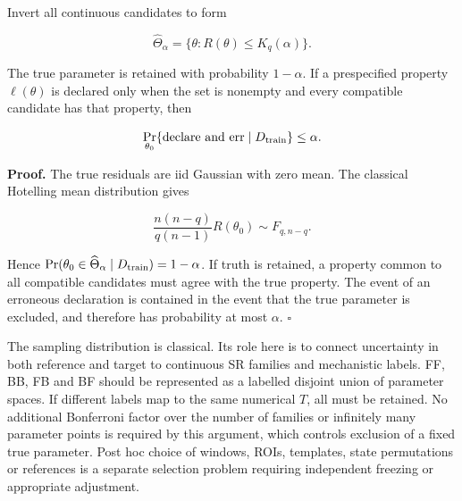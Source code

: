 \documentclass[11pt,a4paper]{article}
\begin{document}
\par
\noindent\begin{minipage}{\linewidth}

Invert all continuous candidates to form

\[
\widehat\Theta_\alpha
=\{\theta:R(\theta)\le K_q(\alpha)\}.
\]

\end{minipage}\par

\par
\noindent\begin{minipage}{\linewidth}

The true parameter is retained with probability \(1-\alpha\). If a
prespecified property \(\ell(\theta)\) is declared only when the set is
nonempty and every compatible candidate has that property, then

\[
\Pr_{\theta_0}\{\text{declare and err}
\mid D_{\rm train}\}\le\alpha.
\]

\end{minipage}\par

\par
\noindent\begin{minipage}{\linewidth}

\textbf{Proof.} The true residuals are iid Gaussian with zero mean. The
classical Hotelling mean distribution gives

\[
\frac{n(n-q)}{q(n-1)}R(\theta_0)\sim F_{q,n-q}.
\]

\end{minipage}\par

Hence
\(\Pr(\theta_0\in\widehat\Theta_\alpha\mid D_{\rm train})=1-\alpha\). If
truth is retained, a property common to all compatible candidates must
agree with the true property. The event of an erroneous declaration is
contained in the event that the true parameter is excluded, and
therefore has probability at most \(\alpha\). \(\square\)

The sampling distribution is classical. Its role here is to connect
uncertainty in both reference and target to continuous SR families and
mechanistic labels. FF, BB, FB and BF should be represented as a
labelled disjoint union of parameter spaces. If different labels map to
the same numerical \(T\), all must be retained. No additional Bonferroni
factor over the number of families or infinitely many parameter points
is required by this argument, which controls exclusion of a fixed true
parameter. Post hoc choice of windows, ROIs, templates, state
permutations or references is a separate selection problem requiring
independent freezing or appropriate adjustment.
\end{document}

